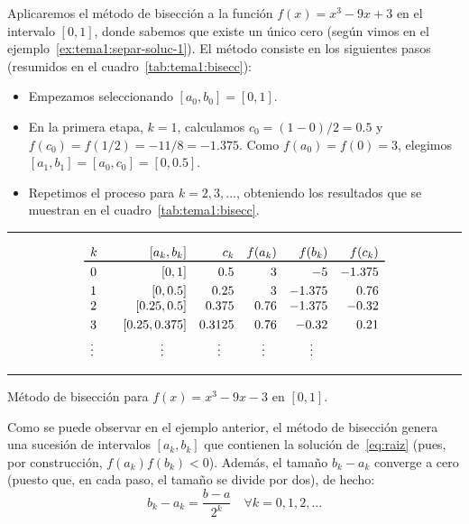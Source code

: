 \begin{example}
  Aplicaremos el método de bisección a la función $f(x)=x^3-9x+3$ en el intervalo
  $[0,1]$, donde sabemos que existe un único cero (según vimos en el
  ejemplo~\ref{ex:tema1:separ-soluc-1}). El método consiste en los
  siguientes pasos (resumidos en el cuadro~\ref{tab:tema1:bisecc}):

  \begin{itemize}
  \item Empezamos seleccionando $[a_0,b_0]=[0,1]$.
  \item En la primera etapa, $k=1$, calculamos 
    $c_0=(1-0)/2=0.5$  y 
    $f(c_0)=f(1/2)=-11/8=-1.375$. Como $f(a_0)=f(0)=3$, elegimos
    $[a_1,b_1]=[a_0,c_0]=[0,0.5]$.
  \item Repetimos el proceso para $k=2,3,...$, obteniendo los resultados que se
    muestran en el cuadro~\ref{tab:tema1:bisecc}.
  \end{itemize}

\end{example}
\begin{table}
  \centering
  \rule{0.99\linewidth}{1.6pt}
  \begin{equation*}
    \begin{array}{l<{\quad}rrrrr}%
     k &  [a_k,b_k] & c_k & f(a_k) & f(b_k) & f(c_k) 
      \\ \toprule%
     0 & [0,1]  &  0.5 
      & 3 & -5 & -1.375
      \\ \noalign{\smallskip}
     1 &  [0,0.5] &  0.25
      & 3 & -1.375 & 0.76
      \\ \smallskip
     2 & [0.25,0.5] & 0.375
      & 0.76 & -1.375 & -0.32
     \\ \smallskip
     3& [0.25,0.375] & 0.3125
      & 0.76 & -0.32 & 0.21
      \\
      \hfill \vdots \hfill~ & \hfill \vdots \hfill~ & 
      \hfill \vdots \hfill~ & \hfill \vdots \hfill~ & \hfill \vdots \hfill~
    \end{array}
  \end{equation*}
  \rule{0.99\linewidth}{1.5pt}
  \caption{Método de bisección para $f(x)=x^3-9x-3$ en $[0,1]$.}
  \label{tab:tema1:bisecc}
\end{table}

Como se puede observar en el ejemplo anterior, el método de bisección
genera una sucesión de intervalos $[a_k,b_k]$ que
contienen la solución de~\eqref{eq:raiz} (pues, por construcción,
$f(a_k)f(b_k)<0$). Además, el tamaño $b_k-a_k$ converge a cero (puesto
que, en cada paso, el tamaño se divide por dos), de hecho:
\begin{equation}
  \label{eq:tema1:bisec:1}
  b_k-a_k = \frac{b-a}{2^k} \quad \forall k=0,1,2,...
\end{equation}

